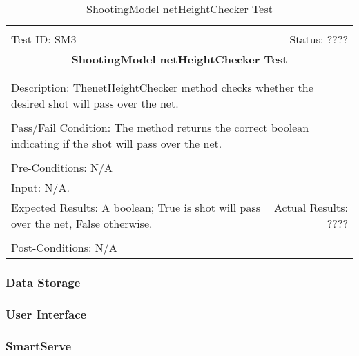 \documentclass[11pt]{article}
\begin{document}
\begin{center}
\begin{table}[H]
\begin{tabular}{|l r|}\hline&\\[-2mm]
	Test ID: SM3	&Status: ????\\[-3mm]
	\multicolumn{2}{|c|}{\textbf{\large{ShootingModel netHeightChecker Test}}}\\&\\\hline&\\[-3mm]
	\multicolumn{2}{|p{\textwidth}|}{Description: ThenetHeightChecker method checks whether the desired shot will pass over the net.}\\[1mm]\hline&\\[-3mm]
	\multicolumn{2}{|p{\textwidth}|}{Pass/Fail Condition: The method returns the correct boolean indicating if the shot will pass over the net.}\\[1mm]\hline&\\[-3mm]
	\multicolumn{2}{|p{\textwidth}|}{Pre-Conditions: N/A}\\[4mm]
	\multicolumn{2}{|p{\textwidth}|}{Input: N/A.}\\[2mm]\hline
	\multicolumn{1}{|p{0.49\textwidth}}{Expected Results: A boolean; True is shot will pass over the net, False otherwise.}	&\multicolumn{1}{|p{0.45\textwidth}|}{Actual Results: ????}\\\hline&\\[-3mm]
	\multicolumn{2}{|p{\textwidth}|}{Post-Conditions: N/A}\\\hline
\end{tabular}
\caption{ShootingModel netHeightChecker Test}
\end{table}
\end{center}

\subsubsection{Data Storage}
\subsubsection{User Interface}
\subsubsection{SmartServe}
\end{document}
